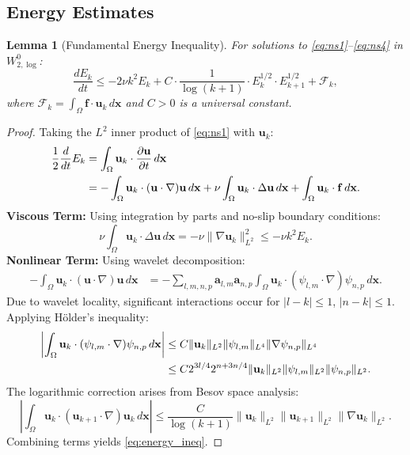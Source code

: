 \documentclass[12pt]{article}
\newtheorem{lemma}[theorem]{Lemma}
\begin{document}
\subsection{Energy Estimates}
\begin{lemma}[Fundamental Energy Inequality]
\label{lemma:energy_ineq}
For solutions to \eqref{eq:ns1}--\eqref{eq:ns4} in $W^0_{2,\log}$:
\begin{equation}
\frac{dE_k}{dt} \leq -2\nu k^2 E_k + C \cdot \frac{1}{\log(k + 1)} \cdot 
E_k^{1/2} \cdot E_{k+1}^{1/2} + \mathcal{F}_k, \label{eq:energy_ineq}
\end{equation}
where $\mathcal{F}_k = \int_\Omega \mathbf{f} \cdot \mathbf{u}_k \, d\mathbf{x}$ 
and $C > 0$ is a universal constant.
\end{lemma}

\begin{proof}
Taking the $L^2$ inner product of \eqref{eq:ns1} with $\mathbf{u}_k$:
\begin{align}
\frac{1}{2}\frac{d}{dt}E_k &= \int_\Omega \mathbf{u}_k \cdot 
\frac{\partial \mathbf{u}}{\partial t} \, d\mathbf{x} \notag \\
&= -\int_\Omega \mathbf{u}_k \cdot (\mathbf{u} \cdot \nabla)\mathbf{u} \, d\mathbf{x} 
+ \nu \int_\Omega \mathbf{u}_k \cdot \Delta \mathbf{u} \, d\mathbf{x} 
+ \int_\Omega \mathbf{u}_k \cdot \mathbf{f} \, d\mathbf{x}.
\end{align}
\textbf{Viscous Term:} Using integration by parts and no-slip boundary conditions:
\begin{equation}
\nu \int_\Omega \mathbf{u}_k \cdot \Delta \mathbf{u} \, d\mathbf{x} = 
-\nu \|\nabla \mathbf{u}_k\|^2_{L^2} \leq -\nu k^2 E_k.
\end{equation}
\textbf{Nonlinear Term:} Using wavelet decomposition:
\begin{align}
-\int_\Omega \mathbf{u}_k \cdot (\mathbf{u} \cdot \nabla)\mathbf{u} \, d\mathbf{x} &= 
-\sum_{l,m,n,p} \mathbf{a}_{l,m} \mathbf{a}_{n,p} \int_\Omega \mathbf{u}_k \cdot 
(\psi_{l,m} \cdot \nabla)\psi_{n,p} \, d\mathbf{x}.
\end{align}
Due to wavelet locality, significant interactions occur for $|l-k| \leq 1$, 
$|n-k| \leq 1$. Applying H\"older's inequality:
\begin{align}
\left|\int_\Omega \mathbf{u}_k \cdot (\psi_{l,m} \cdot \nabla)\psi_{n,p} \, 
d\mathbf{x}\right| &\leq C \|\mathbf{u}_k\|_{L^2} \|\psi_{l,m}\|_{L^4} 
\|\nabla \psi_{n,p}\|_{L^4} \notag \\
&\leq C 2^{3l/4} 2^{n + 3n/4} \|\mathbf{u}_k\|_{L^2} \|\psi_{l,m}\|_{L^2} 
\|\psi_{n,p}\|_{L^2}.
\end{align}
The logarithmic correction arises from Besov space analysis:
\begin{equation}
\left|\int_\Omega \mathbf{u}_k \cdot (\mathbf{u}_{k+1} \cdot \nabla)\mathbf{u}_k \, 
d\mathbf{x}\right| \leq \frac{C}{\log(k + 1)} \|\mathbf{u}_k\|_{L^2} 
\|\mathbf{u}_{k+1}\|_{L^2} \|\nabla \mathbf{u}_k\|_{L^2}.
\end{equation}
Combining terms yields \eqref{eq:energy_ineq}.
\end{proof}
\end{document}
